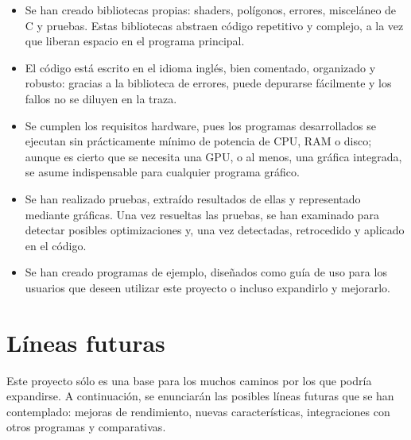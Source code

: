 \begin{itemize}
    \item Se han creado bibliotecas propias: shaders, polígonos, errores, misceláneo de C y pruebas. Estas bibliotecas abstraen código repetitivo y complejo, a la vez que liberan espacio en el programa principal.

    \item El código está escrito en el idioma inglés, bien comentado, organizado y robusto: gracias a la biblioteca de errores, puede depurarse fácilmente y los fallos no se diluyen en la traza.

    \item Se cumplen los requisitos hardware, pues los programas desarrollados se ejecutan sin prácticamente mínimo de potencia de CPU, RAM o disco; aunque es cierto que se necesita una GPU, o al menos, una gráfica integrada, se asume indispensable para cualquier programa gráfico.

    \item Se han realizado pruebas, extraído resultados de ellas y representado mediante gráficas. Una vez resueltas las pruebas, se han examinado para detectar posibles optimizaciones y, una vez detectadas, retrocedido y aplicado en el código.

    \item Se han creado programas de ejemplo, diseñados como guía de uso para los usuarios que deseen utilizar este proyecto o incluso expandirlo y mejorarlo.

\end{itemize}

\section{Líneas futuras}

Este proyecto sólo es una base para los muchos caminos por los que podría expandirse. A continuación, se enunciarán las posibles líneas futuras que se han contemplado: mejoras de rendimiento, nuevas características, integraciones con otros programas y comparativas.

